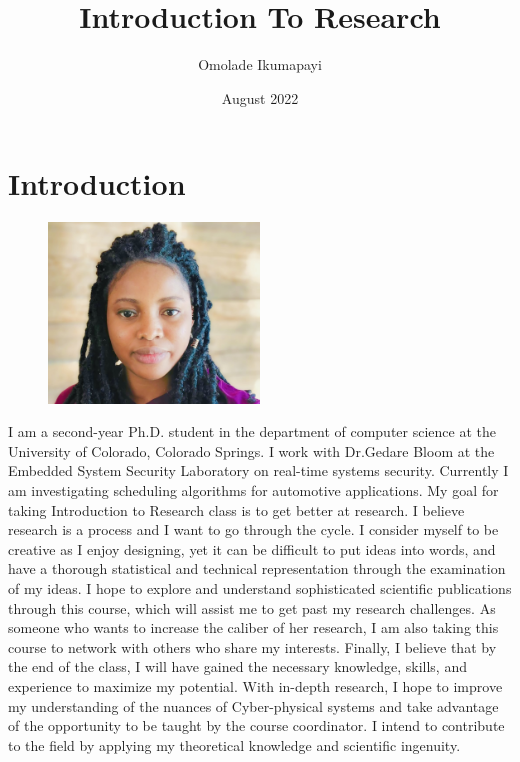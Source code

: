 \title{Introduction To Research}
\author{Omolade Ikumapayi}
\date{August 2022}

\maketitle

\section{Introduction}

\begin{figure}[h!]
  \centering
  \includegraphics[width=0.5\textwidth]{omolade_.jpg}
\end{figure}

I am a second-year Ph.D. student in the department of computer science at the University of Colorado, Colorado Springs. I work with Dr.Gedare Bloom at the Embedded System Security Laboratory on real-time systems security. Currently I am investigating scheduling algorithms for automotive applications. My goal for taking Introduction to Research class is to get better at research. I believe research is a process and I want to go through the cycle. I consider myself to be creative as I enjoy designing, yet it can be difficult to put ideas into words, and have a thorough statistical and technical representation through the examination of my ideas.
I hope to explore and understand sophisticated scientific publications through this course, which will assist me to get past my research challenges. As someone who wants to increase the caliber of her research, I am also taking this course to network with others who share my interests.
Finally, I believe that by the end of the class, I will have gained the necessary knowledge, skills, and experience to  maximize my potential. With in-depth research, I hope to improve my understanding of the nuances of Cyber-physical systems and take advantage of the opportunity to be taught by the course coordinator. I intend to contribute to the field by applying my theoretical knowledge and scientific ingenuity.
